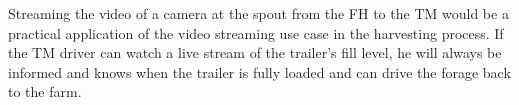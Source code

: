 Streaming the video of a camera at the spout from the \ac{FH} to the \ac{TM} would be a practical application of the video streaming use case in the harvesting process. If the \ac{TM} driver can watch a live stream of the trailer's fill level, he will always be
informed and knows when the trailer is fully loaded and can drive the forage back to the
farm.

